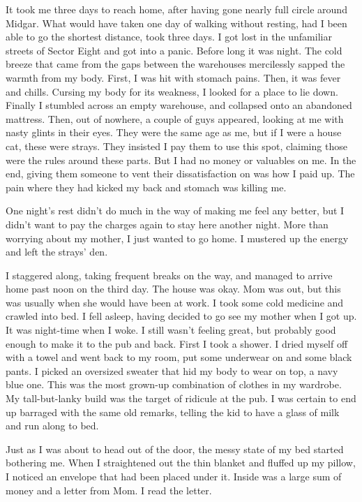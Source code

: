\documentclass[oneside]{book}
\begin{document}
It took me three days to reach home, after having gone nearly full circle around Midgar. What would have taken one day of walking without resting, had I been able to go the shortest distance, took three days. I got lost in the unfamiliar streets of Sector Eight and got into a panic. Before long it was night. The cold breeze that came from the gaps between the warehouses mercilessly sapped the warmth from my body. First, I was hit with stomach pains. Then, it was fever and chills. Cursing my body for its weakness, I looked for a place to lie down. Finally I stumbled across an empty warehouse, and collapsed onto an abandoned mattress. Then, out of nowhere, a couple of guys appeared, looking at me with nasty glints in their eyes. They were the same age as me, but if I were a house cat, these were strays. They insisted I pay them to use this spot, claiming those were the rules around these parts. But I had no money or valuables on me. In the end, giving them someone to vent their dissatisfaction on was how I paid up. The pain where they had kicked my back and stomach was killing me.

One night’s rest didn’t do much in the way of making me feel any better, but I didn’t want to pay the charges again to stay here another night. More than worrying about my mother, I just wanted to go home. I mustered up the energy and left the strays’ den.

I staggered along, taking frequent breaks on the way, and managed to arrive home past noon on the third day. The house was okay. Mom was out, but this was usually when she would have been at work. I took some cold medicine and crawled into bed. I fell asleep, having decided to go see my mother when I got up. It was night-time when I woke. I still wasn’t feeling great, but probably good enough to make it to the pub and back. First I took a shower. I dried myself off with a towel and went back to my room, put some underwear on and some black pants. I picked an oversized sweater that hid my body to wear on top, a navy blue one. This was the most grown-up combination of clothes in my wardrobe. My tall-but-lanky build was the target of ridicule at the pub. I was certain to end up barraged with the same old remarks, telling the kid to have a glass of milk and run along to bed.

Just as I was about to head out of the door, the messy state of my bed started bothering me. When I straightened out the thin blanket and fluffed up my pillow, I noticed an envelope that had been placed under it. Inside was a large sum of money and a letter from Mom. I read the letter.
\end{document}
